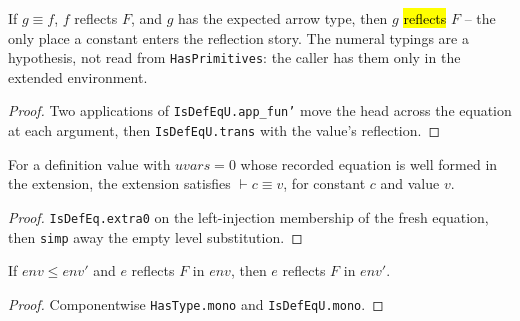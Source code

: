 \begin{theorem}
\label{vpc:thm:reflects-congr-head}
\leanok
{}

 If $g \equiv f$, $f$ reflects $F$, and $g$ has the expected arrow type, then $g$
\hl{reflects} $F$ -- the only place a constant enters the reflection story.
 The numeral typings are a hypothesis, not read from \texttt{HasPrimitives}:
the caller has them only in the extended environment.
\end{theorem}
\begin{proof}\leanok
{}
 Two applications of \texttt{IsDefEqU.app\_fun'} move the head across the equation at
each argument, then \texttt{IsDefEqU.trans} with the value's reflection.
\end{proof}

\begin{lemma}
\label{vpc:thm:isdefequ-todefeq}\leanok
{}

 For a definition value with $\mathit{uvars} = 0$ whose recorded equation is well
formed in the extension, the extension satisfies $\vdash c \equiv v$, for constant $c$ and value
$v$.
\end{lemma}
\begin{proof}\leanok
{} \texttt{IsDefEq.extra0} on the left-injection membership of the fresh equation, then
\texttt{simp} away the empty level substitution.
\end{proof}

\begin{lemma}
\label{vpc:lem:reflects-mono}
\leanok
{}

 If $\mathit{env} \le \mathit{env}'$ and $e$ reflects $F$ in $\mathit{env}$, then
$e$ reflects $F$ in $\mathit{env}'$.
\end{lemma}
\begin{proof}\leanok
{}
 Componentwise \texttt{HasType.mono} and \texttt{IsDefEqU.mono}.
\end{proof}

